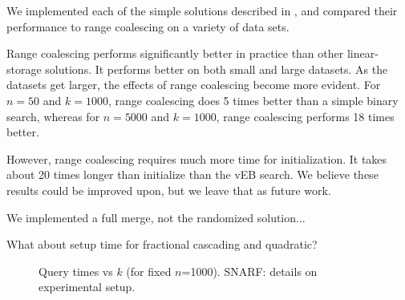 We implemented each of the simple solutions described in 
, and compared their performance to range coalescing on a variety of data sets. 

Range coalescing performs significantly better in practice than other 
linear-storage solutions. It performs better on both small and large datasets. 
As the datasets get larger, the effects of range coalescing become more evident. 
For $n=50$ and $k=1000$, range coalescing does 5 times better than a simple binary search,
whereas for $n=5000$ and $k=1000$, range coalescing performs 18 times better.

However, range coalescing requires much more time for initialization. 
It takes about 20 times longer than initialize than the vEB search. 
We believe these results could be improved upon, but we leave that as future work.

We implemented a full merge, not the randomized solution...

What about setup time for fractional cascading and quadratic?




\begin{figure}
\caption{Query times vs $k$ (for fixed $n$=1000).  SNARF: details on experimental setup.}
\end{figure}

